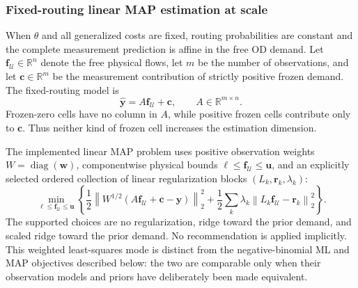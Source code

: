 \subsubsection{Fixed-routing linear MAP estimation at scale}
\label{sec:fixed-routing-linear-map}

When $\theta$ and all generalized costs are fixed, routing probabilities are
constant and the complete measurement prediction is affine in the free OD
demand.  Let $\bm f_{\mathcal U}\in\mathbb R^n$ denote the free physical flows,
let $m$ be the number of observations, and let $\bm c\in\mathbb R^m$ be the
measurement contribution of strictly positive frozen demand.  The fixed-routing
model is
\[
\widehat{\bm y}=A\bm f_{\mathcal U}+\bm c,
\qquad A\in\mathbb R^{m\times n}.
\]
Frozen-zero cells have no column in $A$, while positive frozen cells contribute
only to $\bm c$.  Thus neither kind of frozen cell increases the estimation
dimension.

The implemented linear MAP problem uses positive observation weights
$W=\operatorname{diag}(\bm w)$, componentwise physical bounds
$\bm\ell\leq\bm f_{\mathcal U}\leq\bm u$, and an explicitly selected ordered
collection of linear regularization blocks $(L_k,\bm r_k,\lambda_k)$:
\[
\min_{\bm\ell\leq\bm f_{\mathcal U}\leq\bm u}
\left\{
\frac12\left\|W^{1/2}
  (A\bm f_{\mathcal U}+\bm c-\bm y)\right\|_2^2
+\frac12\sum_k\lambda_k
  \left\|L_k\bm f_{\mathcal U}-\bm r_k\right\|_2^2
\right\}.
\]
The supported choices are no regularization, ridge toward the prior demand, and
scaled ridge toward the prior demand.  No recommendation is applied implicitly.
This weighted least-squares mode is distinct from the negative-binomial ML and
MAP objectives described below: the two are comparable only when their
observation models and priors have deliberately been made equivalent.


